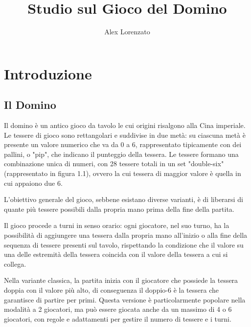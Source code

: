 \documentclass[a4paper,12pt]{report}
\begin{document}
\title{Studio sul Gioco del Domino}
\author{Alex Lorenzato}

\maketitle
\tableofcontents 


\chapter{Introduzione}

\section{Il Domino}

Il domino è un antico gioco da tavolo le cui origini risalgono alla Cina imperiale. 
Le tessere di gioco sono rettangolari e suddivise in due metà: su ciascuna metà è presente un valore numerico che va da 0 a 6, rappresentato tipicamente con dei pallini, o "pip", che indicano il punteggio della tessera. 
Le tessere formano una combinazione unica di numeri, con 28 tessere totali in un set "double-six" (rappresentato in figura 1.1), ovvero la cui tessera di maggior valore è quella in cui appaiono due 6.

L'obiettivo generale del gioco, sebbene esistano diverse varianti, è di liberarsi di quante più tessere possibili dalla propria mano prima della fine della partita. 

Il gioco procede a turni in senso orario: ogni giocatore, nel suo turno, ha la possibilità di aggiungere una tessera dalla propria mano all'inizio o alla fine della sequenza di tessere presenti sul tavolo, rispettando la condizione che il valore su una delle estremità della tessera coincida con il valore della tessera a cui si collega. 

Nella variante classica, la partita inizia con il giocatore che possiede la tessera doppia con il valore più alto, di conseguenza il doppio-6 è la tessera che garantisce di partire per primi. Questa versione è particolarmente popolare nella modalità a 2 giocatori, ma può essere giocata anche da un massimo di 4 o 6 giocatori, con regole e adattamenti per gestire il numero di tessere e i turni.
\end{document}
